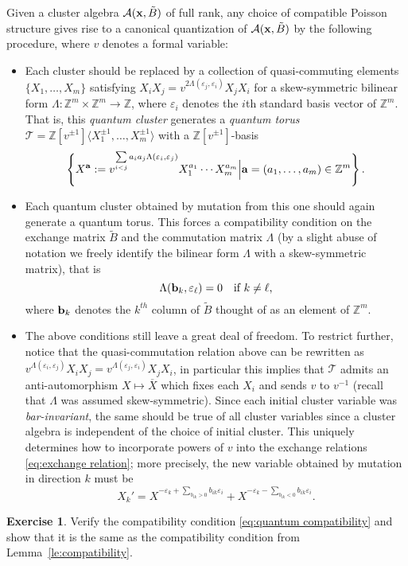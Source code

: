 \documentclass{amsart}
\theoremstyle{definition}
\newtheorem{exercise}[theorem]{Exercise}
\theoremstyle{remark}
\numberwithin{equation}{section}
\newcommand{\cA}{{\mathcal{A}}}
\newcommand{\cT}{{\mathcal{T}}}
\newcommand{\ba}{{\bf a}}
\newcommand{\bb}{{\bf b}}
\newcommand{\bx}{{\bf x}}
\newcommand{\ZZ}{{\mathbb{Z}}}
\begin{document}
  Given a cluster algebra $\cA(\bx,\tilde B)$ of full rank, any choice of compatible Poisson structure gives rise to a canonical quantization of $\cA(\bx,\tilde B)$ by the following procedure, where $v$ denotes a formal variable:
  \begin{itemize}
    \item Each cluster should be replaced by a collection of quasi-commuting elements $\{X_1,\ldots,X_m\}$ satisfying $X_iX_j=v^{2\Lambda(\varepsilon_j,\varepsilon_i)}X_jX_i$ for a skew-symmetric bilinear form $\Lambda:\ZZ^m\times\ZZ^m\to\ZZ$, where $\varepsilon_i$ denotes the $i$th standard basis vector of $\ZZ^m$.  That is, this \emph{quantum cluster} generates a \emph{quantum torus} $\cT=\ZZ[v^{\pm1}]\langle X_1^{\pm1},\ldots,X_m^{\pm1}\rangle$ with a $\ZZ[v^{\pm1}]$-basis 
    \[\left\{X^\ba:=v^{\sum\limits_{i<j}a_ia_j\Lambda(\varepsilon_i,\varepsilon_j)}X_1^{a_1}\cdots X_m^{a_m}\Big|\ba=(a_1,\ldots,a_m)\in\ZZ^m\right\}.\]
    \item Each quantum cluster obtained by mutation from this one should again generate a quantum torus.  This forces a compatibility condition on the exchange matrix $\tilde B$ and the commutation matrix $\Lambda$ (by a slight abuse of notation we freely identify the bilinear form $\Lambda$ with a skew-symmetric matrix), that is 
    \begin{equation}\label{eq:quantum compatibility}
      \Lambda(\bb_k,\varepsilon_\ell)=0\quad\text{if $k\ne\ell$,}
    \end{equation}
    where $\bb_k$ denotes the $k^{th}$ column of $\tilde B$ thought of as an element of $\ZZ^m$.
    \item The above conditions still leave a great deal of freedom.  To restrict further, notice that the quasi-commutation relation above can be rewritten as $v^{\Lambda(\varepsilon_i,\varepsilon_j)}X_iX_j=v^{\Lambda(\varepsilon_j,\varepsilon_i)}X_jX_i$, in particular this implies that $\cT$ admits an anti-automorphism $X\mapsto \overline{X}$ which fixes each $X_i$ and sends $v$ to $v^{-1}$ (recall that $\Lambda$ was assumed skew-symmetric).  Since each initial cluster variable was \emph{bar-invariant}, the same should be true of all cluster variables since a cluster algebra is independent of the choice of initial cluster.  This uniquely determines how to incorporate powers of $v$ into the exchange relations \eqref{eq:exchange relation}; more precisely, the new variable obtained by mutation in direction $k$ must be
    \[X_k'=X^{-\varepsilon_k+\sum\limits_{b_{ik}>0}b_{ik}\varepsilon_i}+X^{-\varepsilon_k-\sum\limits_{b_{ik}<0}b_{ik}\varepsilon_i}.\]
  \end{itemize}
  \begin{exercise}
    Verify the compatibility condition \eqref{eq:quantum compatibility} and show that it is the same as the compatibility condition from Lemma~\ref{le:compatibility}.
  \end{exercise}
\end{document}
